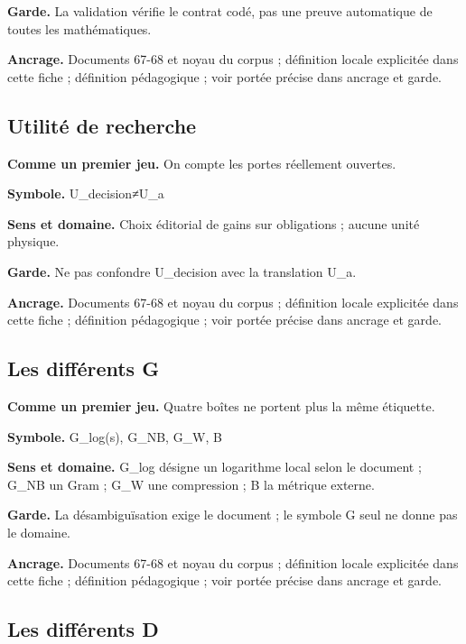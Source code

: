 \documentclass[
  9pt,
  a4paper,
]{article}
\begin{document}
\textbf{Garde.} La validation vérifie le contrat codé, pas une preuve
automatique de toutes les mathématiques.

\textbf{Ancrage.} Documents 67-68 et noyau du corpus ; définition locale
explicitée dans cette fiche ; définition pédagogique ; voir portée
précise dans ancrage et garde.

\hypertarget{utilituxe9-de-recherche}{%
\subsection{Utilité de recherche}\label{utilituxe9-de-recherche}}

\textbf{Comme un premier jeu.} On compte les portes réellement ouvertes.

\textbf{Symbole.} U\_decision≠U\_a

\textbf{Sens et domaine.} Choix éditorial de gains sur obligations ;
aucune unité physique.

\textbf{Garde.} Ne pas confondre U\_decision avec la translation U\_a.

\textbf{Ancrage.} Documents 67-68 et noyau du corpus ; définition locale
explicitée dans cette fiche ; définition pédagogique ; voir portée
précise dans ancrage et garde.

\hypertarget{les-diffuxe9rents-g}{%
\subsection{Les différents G}\label{les-diffuxe9rents-g}}

\textbf{Comme un premier jeu.} Quatre boîtes ne portent plus la même
étiquette.

\textbf{Symbole.} G\_log(s), G\_NB, G\_W, B

\textbf{Sens et domaine.} G\_log désigne un logarithme local selon le
document ; G\_NB un Gram ; G\_W une compression ; B la métrique externe.

\textbf{Garde.} La désambiguïsation exige le document ; le symbole G
seul ne donne pas le domaine.

\textbf{Ancrage.} Documents 67-68 et noyau du corpus ; définition locale
explicitée dans cette fiche ; définition pédagogique ; voir portée
précise dans ancrage et garde.

\hypertarget{les-diffuxe9rents-d}{%
\subsection{Les différents D}\label{les-diffuxe9rents-d}}
\end{document}
